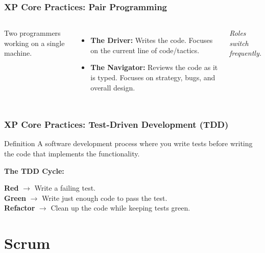 \documentclass[xcolor=table]{beamer}
\begin{document}
\begin{frame}
    \frametitle{XP Core Practices: Pair Programming}
    \begin{columns}
        Two programmers working on a single machine.
        \begin{itemize}
            \item \textbf{The Driver:} Writes the code. Focuses on the current line of code/tactics.
            \item \textbf{The Navigator:} Reviews the code as it is typed. Focuses on strategy, bugs, and overall design.
        \end{itemize}
        \textit{Roles switch frequently.}
        
        \centering
    \end{columns}
\end{frame}


\begin{frame}
    \frametitle{XP Core Practices: Test-Driven Development (TDD)}
    \begin{block}{Definition}
        A software development process where you write tests before writing the code that implements the functionality.
    \end{block}
    
    \vspace{0.5cm}
    \textbf{The TDD Cycle:}
    \begin{center}
        \textbf{Red} $\rightarrow$ Write a failing test.\\
        \textbf{Green} $\rightarrow$ Write just enough code to pass the test.\\
        \textbf{Refactor} $\rightarrow$ Clean up the code while keeping tests green.
    \end{center}
\end{frame}

\section{Scrum}
\end{document}
